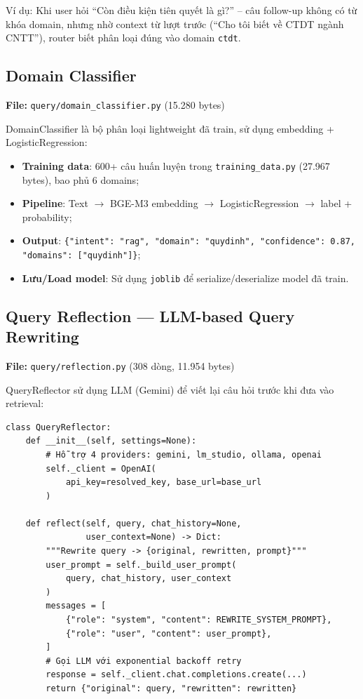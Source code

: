 \documentclass[../DoAn.tex]{subfiles}
\begin{document}
Ví dụ: Khi user hỏi ``Còn điều kiện tiên quyết là gì?'' -- câu follow-up không có từ khóa domain, nhưng nhờ context từ lượt trước (``Cho tôi biết về CTDT ngành CNTT''), router biết phân loại đúng vào domain \texttt{ctdt}.

\subsection{Domain Classifier}
\textbf{File:} \texttt{query/domain\_classifier.py} (15.280 bytes)

DomainClassifier là bộ phân loại lightweight đã train, sử dụng embedding + LogisticRegression:
\begin{itemize}
    \item \textbf{Training data}: 600+ câu huấn luyện trong \texttt{training\_data.py} (27.967 bytes), bao phủ 6 domains;
    \item \textbf{Pipeline}: Text $\rightarrow$ BGE-M3 embedding $\rightarrow$ LogisticRegression $\rightarrow$ label + probability;
    \item \textbf{Output}: \texttt{\{"intent": "rag", "domain": "quydinh", "confidence": 0.87, "domains": ["quydinh"]\}};
    \item \textbf{Lưu/Load model}: Sử dụng \texttt{joblib} để serialize/deserialize model đã train.
\end{itemize}

\subsection{Query Reflection --- LLM-based Query Rewriting}
\textbf{File:} \texttt{query/reflection.py} (308 dòng, 11.954 bytes)

QueryReflector sử dụng LLM (Gemini) để viết lại câu hỏi trước khi đưa vào retrieval:
\begin{verbatim}
class QueryReflector:
    def __init__(self, settings=None):
        # Hỗ trợ 4 providers: gemini, lm_studio, ollama, openai
        self._client = OpenAI(
            api_key=resolved_key, base_url=base_url
        )

    def reflect(self, query, chat_history=None,
                user_context=None) -> Dict:
        """Rewrite query -> {original, rewritten, prompt}"""
        user_prompt = self._build_user_prompt(
            query, chat_history, user_context
        )
        messages = [
            {"role": "system", "content": REWRITE_SYSTEM_PROMPT},
            {"role": "user", "content": user_prompt},
        ]
        # Gọi LLM với exponential backoff retry
        response = self._client.chat.completions.create(...)
        return {"original": query, "rewritten": rewritten}
\end{verbatim}
\end{document}
